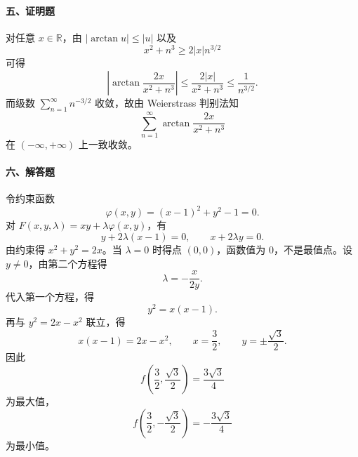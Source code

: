 \paragraph*{五、证明题}
对任意 $x\in\mathbb R$，由 $|\arctan u|\le |u|$ 以及
\[
  x^2+n^3\ge 2|x|n^{3/2}
\]
可得
\[
  \left|\arctan\frac{2x}{x^2+n^3}\right|
  \le
  \frac{2|x|}{x^2+n^3}
  \le
  \frac1{n^{3/2}}.
\]
而级数 $\sum_{n=1}^{\infty}n^{-3/2}$ 收敛，故由 Weierstrass 判别法知
\[
  \sum_{n=1}^{\infty}\arctan\frac{2x}{x^2+n^3}
\]
在 $(-\infty,+\infty)$ 上一致收敛。

\paragraph*{六、解答题}
令约束函数
\[
  \varphi(x,y)=(x-1)^2+y^2-1=0.
\]
对 $F(x,y,\lambda)=xy+\lambda\varphi(x,y)$，有
\[
  y+2\lambda(x-1)=0,\qquad x+2\lambda y=0.
\]
由约束得 $x^2+y^2=2x$。当 $\lambda=0$ 时得点 $(0,0)$，函数值为 $0$，不是最值点。设 $y\ne0$，由第二个方程得
\[
  \lambda=-\frac{x}{2y}.
\]
代入第一个方程，得
\[
  y^2=x(x-1).
\]
再与 $y^2=2x-x^2$ 联立，得
\[
  x(x-1)=2x-x^2,\qquad x=\frac32,\qquad y=\pm\frac{\sqrt3}{2}.
\]
因此
\[
  f\left(\frac32,\frac{\sqrt3}{2}\right)=\frac{3\sqrt3}{4}
  \]
为最大值，
\[
  f\left(\frac32,-\frac{\sqrt3}{2}\right)=-\frac{3\sqrt3}{4}
  \]
为最小值。

